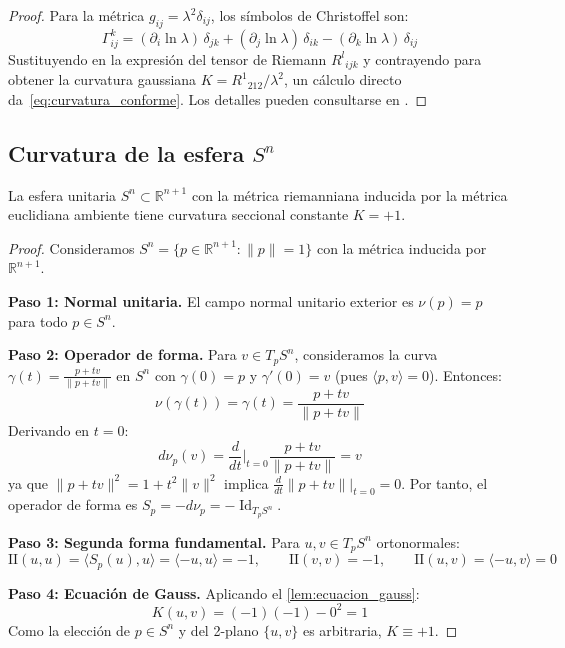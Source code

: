 \begin{proof}
Para la métrica $g_{ij} = \lambda^2 \delta_{ij}$, los símbolos de Christoffel son:
\[
\Gamma^k_{ij} = (\partial_i \ln\lambda)\,\delta_{jk} + (\partial_j \ln\lambda)\,\delta_{ik} - (\partial_k \ln\lambda)\,\delta_{ij}
\]
Sustituyendo en la expresión del tensor de Riemann $R^l{}_{ijk}$ y contrayendo para obtener la curvatura gaussiana $K = R^1{}_{212}/\lambda^2$, un cálculo directo da~\eqref{eq:curvatura_conforme}. Los detalles pueden consultarse en \citet[Proposición~8.32]{lee2018introduction}.
\end{proof}

\subsection{Curvatura de la esfera \texorpdfstring{$S^n$}{Sn}}\label{subsec:curvatura_esfera}

\begin{theorem}\label{thm:curvatura_esfera}
La esfera unitaria $S^n \subset \mathbb{R}^{n+1}$ con la métrica riemanniana inducida por la métrica euclidiana ambiente tiene curvatura seccional constante $K = +1$.
\end{theorem}

\begin{proof}
Consideramos $S^n = \{p \in \mathbb{R}^{n+1} : \|p\| = 1\}$ con la métrica inducida por $\mathbb{R}^{n+1}$.

\textbf{Paso 1: Normal unitaria.}
El campo normal unitario exterior es $\nu(p) = p$ para todo $p \in S^n$.

\textbf{Paso 2: Operador de forma.}
Para $v \in T_pS^n$, consideramos la curva $\gamma(t) = \frac{p + tv}{\|p + tv\|}$ en $S^n$ con $\gamma(0) = p$ y $\gamma'(0) = v$ (pues $\langle p, v \rangle = 0$). Entonces:
\[
\nu(\gamma(t)) = \gamma(t) = \frac{p + tv}{\|p + tv\|}
\]
Derivando en $t = 0$:
\[
d\nu_p(v) = \frac{d}{dt}\bigg|_{t=0} \frac{p + tv}{\|p + tv\|} = v
\]
ya que $\|p + tv\|^2 = 1 + t^2\|v\|^2$ implica $\frac{d}{dt}\|p+tv\|\big|_{t=0} = 0$. Por tanto, el operador de forma es $S_p = -d\nu_p = -\operatorname{Id}_{T_pS^n}$.

\textbf{Paso 3: Segunda forma fundamental.}
Para $u, v \in T_pS^n$ ortonormales:
\[
\mathrm{II}(u,u) = \langle S_p(u), u \rangle = \langle -u, u \rangle = -1, \qquad \mathrm{II}(v,v) = -1, \qquad \mathrm{II}(u,v) = \langle -u, v \rangle = 0
\]

\textbf{Paso 4: Ecuación de Gauss.}
Aplicando el \autoref{lem:ecuacion_gauss}:
\[
K(u,v) = (-1)(-1) - 0^2 = 1
\]
Como la elección de $p \in S^n$ y del 2-plano $\{u,v\}$ es arbitraria, $K \equiv +1$.
\end{proof}

